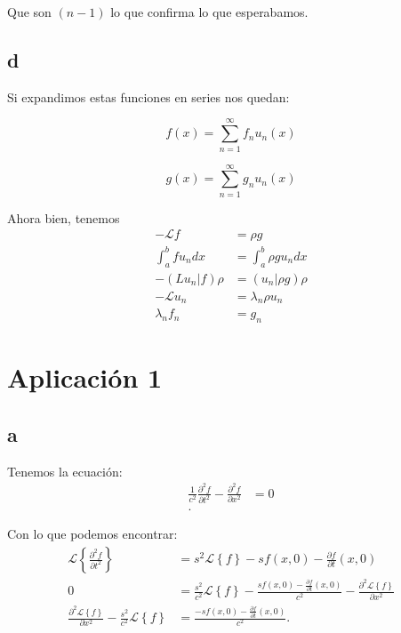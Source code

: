 \documentclass{report}
\newcommand{\Lagr}{\mathcal{L}}
\begin{document}
Que son $(n - 1)$ lo que confirma lo que esperabamos.

\section{d}

Si expandimos estas funciones en series nos quedan:

$$f(x) = \sum_{n=1}^\infty f_n u_n(x)$$

$$g(x) = \sum_{n=1}^\infty g_n u_n(x)$$

Ahora bien, tenemos
\begin{align*}
-\Lagr f &= \rho g\\
\int_a^b f u_n dx &= \int_a^b \rho g u_n dx\\
-(Lu_n|f)\rho &= (u_n|\rho g)\rho\\
-\Lagr u_n &= \lambda_n \rho u_n\\
\lambda_n f_n &= g_n
\end{align*}

\chapter{Aplicación 1}

\section{a}

Tenemos la ecuación:
\begin{align*}
  \frac{1}{c^2}\frac{\partial^2 f}{\partial t^2} - \frac{\partial^2 f}{\partial x^2} &= 0 \\
.\end{align*}

Con lo que podemos encontrar:
\begin{align*}
  \Lagr \left\{ \frac{\partial^2 f}{\partial t^2}  \right\} &= s^2\Lagr \left\{ f \right\} - sf\left( x, 0 \right) - \frac{\partial f}{\partial t} \left( x, 0 \right)  \\
  0 &= \frac{s^2}{c^2}\Lagr \left\{ f \right\} - \frac{sf\left( x, 0 \right) - \frac{\partial f}{\partial t} \left( x, 0 \right)}{c^2} - \frac{\partial^2 \Lagr\left\{ f \right\} }{\partial x^2} \\
  \frac{\partial^2 \Lagr\left\{ f \right\} }{\partial x^2} - \frac{s^2}{c^2}\Lagr \left\{ f \right\} &= \frac{-sf\left( x, 0 \right) - \frac{\partial f}{\partial t} \left( x, 0 \right)}{c^2} 
.\end{align*}
\end{document}
